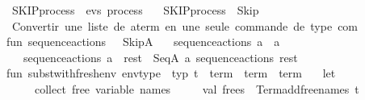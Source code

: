 \begin{isabellebody}
\endisatagML
{\isafoldML}%
%
\isadelimML
%
\endisadelimML
%
\isadelimdocument
%
\endisadelimdocument
%
\isatagdocument
%
\isamarkuptrue%
%
\endisatagdocument
{\isafolddocument}%
%
\isadelimdocument
%
\endisadelimdocument
{}\isamarkupfalse%
\ SKIP{\isacharunderscore}{\kern0pt}process\ {\isacharcolon}{\kern0pt}{\isacharcolon}{\kern0pt}\ {\isachardoublequoteopen}evs\ process{\isachardoublequoteclose}\isanewline
\ \ \ {\isachardoublequoteopen}SKIP{\isacharunderscore}{\kern0pt}process\ {\isasymequiv}\ Skip{\isachardoublequoteclose}\isanewline
%
\isadelimML
\isanewline
%
\endisadelimML
%
\isatagML
{}\isamarkupfalse%
{\isacartoucheopen}\isanewline
{\isacharparenleft}{\kern0pt}{\isacharasterisk}{\kern0pt}\ Convertir\ une\ liste\ de\ a{\isacharunderscore}{\kern0pt}term\ en\ une\ seule\ commande\ de\ type\ com\ {\isacharasterisk}{\kern0pt}{\isacharparenright}{\kern0pt}\isanewline
fun\ sequence{\isacharunderscore}{\kern0pt}actions\ {\isacharbrackleft}{\kern0pt}{\isacharbrackright}{\kern0pt}\ {\isacharequal}{\kern0pt}\ SkipA\isanewline
\ \ {\isacharbar}{\kern0pt}\ sequence{\isacharunderscore}{\kern0pt}actions\ {\isacharbrackleft}{\kern0pt}a{\isacharbrackright}{\kern0pt}\ {\isacharequal}{\kern0pt}\ a\isanewline
\ \ {\isacharbar}{\kern0pt}\ sequence{\isacharunderscore}{\kern0pt}actions\ {\isacharparenleft}{\kern0pt}a\ {\isacharcolon}{\kern0pt}{\isacharcolon}{\kern0pt}\ rest{\isacharparenright}{\kern0pt}\ {\isacharequal}{\kern0pt}\ SeqA\ {\isacharparenleft}{\kern0pt}a{\isacharcomma}{\kern0pt}\ sequence{\isacharunderscore}{\kern0pt}actions\ rest{\isacharparenright}{\kern0pt}\isanewline
{\isacharparenleft}{\kern0pt}{\isacharasterisk}{\kern0pt}\isanewline
fun\ subst{\isacharunderscore}{\kern0pt}with{\isacharunderscore}{\kern0pt}fresh{\isacharunderscore}{\kern0pt}env\ {\isacharparenleft}{\kern0pt}env{\isacharunderscore}{\kern0pt}type\ {\isacharcolon}{\kern0pt}\ typ{\isacharparenright}{\kern0pt}\ {\isacharparenleft}{\kern0pt}t\ {\isacharcolon}{\kern0pt}\ term{\isacharparenright}{\kern0pt}\ {\isacharcolon}{\kern0pt}\ term\ {\isacharasterisk}{\kern0pt}\ term\ {\isacharequal}{\kern0pt}\isanewline
\ \ let\isanewline
\ \ \ \ {\isacharparenleft}{\kern0pt}{\isacharasterisk}{\kern0pt}\ collect\ free\ variable\ names\ {\isacharasterisk}{\kern0pt}{\isacharparenright}{\kern0pt}\isanewline
\ \ \ \ val\ frees\ {\isacharequal}{\kern0pt}\ Term{\isachardot}{\kern0pt}add{\isacharunderscore}{\kern0pt}free{\isacharunderscore}{\kern0pt}names\ t\ {\isacharbrackleft}{\kern0pt}{\isacharbrackright}{\kern0pt}\isanewline

\end{isabellebody}
